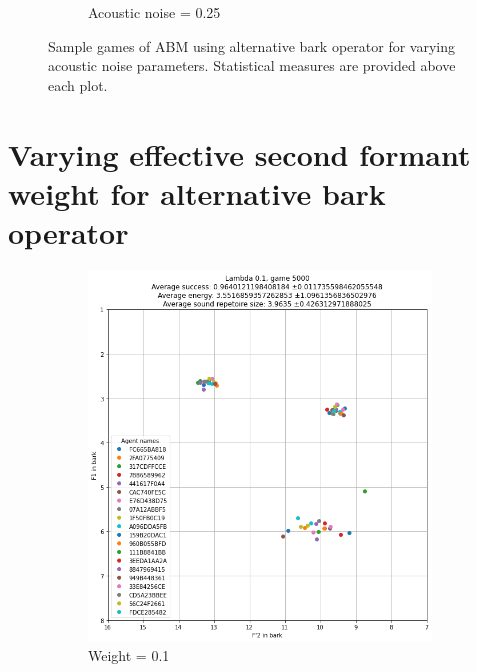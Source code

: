 \begin{figure}[ht]
\begin{subfigure}{.30\textwidth}
        \captionsetup{width=0.9\linewidth}
        \captionsetup{justification=centering}
        \caption{Acoustic noise = 0.25}
    \end{subfigure}
    \captionsetup{width=0.9\linewidth}
    \captionsetup{justification=centering}
    \caption{Sample games of ABM using alternative bark operator for varying acoustic noise parameters. Statistical measures are provided above each plot.}
    \label{fig:bark_noise_impact}
\end{figure}

\clearpage
\section*{Varying effective second formant weight for alternative bark operator}
\begin{figure}[ht]
    \centering
    \begin{subfigure}{.30\textwidth}
        \centering
        \includegraphics[width=\textwidth]{images/extra/bark_weight_1.png}
        \captionsetup{width=0.9\linewidth}
        \captionsetup{justification=centering}
        \caption{Weight = 0.1}
    \end{subfigure}
    \hspace{0.5cm}
    \begin{subfigure}{.30\textwidth}

\end{subfigure}
\end{figure}
